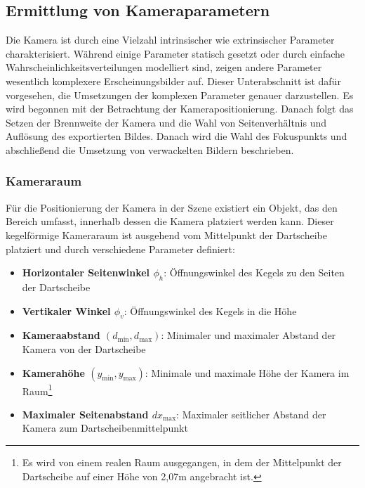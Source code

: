 \subsection{Ermittlung von Kameraparametern}  %
\label{sec:ermittlung_kameraparamater}

Die Kamera ist durch eine Vielzahl intrinsischer wie extrinsischer Parameter charakterisiert. Während einige Parameter statisch gesetzt oder durch einfache Wahrscheinlichkeitsverteilungen modelliert sind, zeigen andere Parameter wesentlich komplexere Erscheinungsbilder auf. Dieser Unterabschnitt ist dafür vorgesehen, die Umsetzungen der komplexen Parameter genauer darzustellen. Es wird begonnen mit der Betrachtung der Kamerapositionierung. Danach folgt das Setzen der Brennweite der Kamera und die Wahl von Seitenverhältnis und Auflösung des exportierten Bildes. Danach wird die Wahl des Fokuspunkts und abschließend die Umsetzung von verwackelten Bildern beschrieben.

\subsubsection{Kameraraum}
\label{sec:kameraraum}

Für die Positionierung der Kamera in der Szene existiert ein Objekt, das den Bereich umfasst, innerhalb dessen die Kamera platziert werden kann. Dieser kegelförmige Kameraraum ist ausgehend vom Mittelpunkt der Dartscheibe platziert und durch verschiedene Parameter definiert:

\begin{itemize}
    \item \textbf{Horizontaler Seitenwinkel $\phi_h$}: Öffnungswinkel des Kegels zu den Seiten der Dartscheibe
    \item \textbf{Vertikaler Winkel $\phi_v$}: Öffnungswinkel des Kegels in die Höhe
    \item \textbf{Kameraabstand $\left(d_\text{min}, d_\text{max}\right)$}: Minimaler und maximaler Abstand der Kamera von der Dartscheibe
    \item \textbf{Kamerahöhe $\left(y_\text{min}, y_\text{max}\right)$}: Minimale und maximale Höhe der Kamera im Raum\footnote{Es wird von einem realen Raum ausgegangen, in dem der Mittelpunkt der Dartscheibe auf einer Höhe von 2,07m angebracht ist.}
    \item \textbf{Maximaler Seitenabstand $dx_\text{max}$}: Maximaler seitlicher Abstand der Kamera zum Dartscheibenmittelpunkt
\end{itemize}

